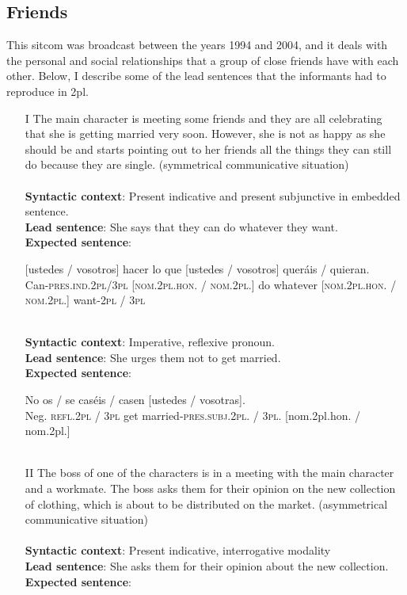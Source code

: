 \documentclass[output=paper]{LSP/langsci}
\begin{document}
\subsection{Friends}
This sitcom was broadcast between the years 1994 and 2004, and it deals with the personal and social relationships that a group of close friends have with each other. Below, I describe some of the lead sentences that the informants had to reproduce in 2pl.

\begin{enumerate}
\item [I] The main character is meeting some friends and they are all celebrating that she is getting married very soon. However, she is not as happy as she should be and starts pointing out to her friends all the things they can still do because they are single. (symmetrical communicative situation)\\
\\
\textbf{Syntactic context}: Present indicative and present subjunctive in embedded sentence.\\
\textbf{Lead sentence}: She says that they can do whatever they want. \\
\textbf{Expected sentence}:

\ea
{} {[ustedes / vosotros]} hacer {lo que} {[ustedes / vosotros]} {queráis / quieran}.\\
{Can-\textsc{pres.ind.2pl/3pl}} \textsc{[nom.2pl.hon. / nom.2pl.]} do whatever \textsc{[nom.2pl.hon. / nom.2pl.]} want-\textsc{2pl / 3pl}\\
\\
\z

\textbf{Syntactic context}: Imperative, reflexive pronoun.\\
\textbf{Lead sentence}: She urges them not to get married.\\ 
\textbf{Expected sentence}:

\ea
\gll No   {os / se}               {caséis / casen}            {[ustedes / vosotras]}.\\
Neg. {\textsc{refl.2pl / 3pl}} {get married-\textsc{pres.subj.2pl. / 3pl.}} {[nom.2pl.hon. / nom.2pl.]}\\
\\
\z

\item [II] The boss of one of the characters is in a meeting with the main character and a workmate. The boss asks them for their opinion on the new collection of clothing, which is about to be distributed on the market. (asymmetrical communicative situation)\\
\\
\textbf{Syntactic context}: Present indicative, interrogative modality\\
\textbf{Lead sentence}: She asks them for their opinion about the new collection.\\
\textbf{Expected sentence}:


\end{enumerate}
\end{document}
